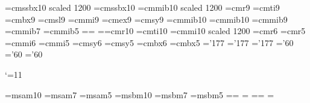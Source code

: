 \newdimen\chapskip
\font\twbf=cmssbx10 scaled 1200 \font\ssbx=cmssbx10
\font\twbi=cmmib10 scaled 1200 \font\caprm=cmr9 \font\capit=cmti9
\font\capbf=cmbx9 \font\capsl=cmsl9 \font\capmi=cmmi9
\font\capex=cmex9 \font\capsy=cmsy9 \chapskip=17.5mm
\def\makeheadline{\vbox to 0pt{\vskip-22.5pt
\line{\vbox to8.5pt{}\the\headline}\vss}\nointerlineskip}
\font\tbfi=cmmib10  %
\font\tenbi=cmmib10 \font\ninebi=cmmib9 \font\sevenbi=cmmib7
\font\fivebi=cmmib5 =\tenbi {}=\sevenbi
{}=\fivebi \font\headrm=cmr10 \font\headit=cmti10
\font\twmi=cmmi10 scaled 1200
\font\sixrm=cmr6 \font\fiverm=cmr5 \font\sixmi=cmmi6
\font\fivemi=cmmi5 \font\sixsy=cmsy6 \font\fivesy=cmsy5
\font\sixbf=cmbx6 \font\fivebf=cmbx5 \skewchar\capmi='177
\skewchar\sixmi='177 \skewchar\fivemi='177 \skewchar\capsy='60
\skewchar\sixsy='60 \skewchar\fivesy='60

\def\elevenpoint{
\textfont0=\caprm \scriptfont0=\sixrm \scriptscriptfont0=\fiverm
\def\rm{\fam0\caprm}
\textfont1=\capmi \scriptfont1=\sixmi \scriptscriptfont1=\fivemi
\textfont2=\capsy \scriptfont2=\sixsy \scriptscriptfont2=\fivesy
\textfont3=\capex \scriptfont3=\capex \scriptscriptfont3=\capex
\textfont\itfam=\capit \def\it{\fam\itfam\capit} %
\textfont\slfam=\capsl  \def\sl{\fam\slfam\capsl} %
\textfont\bffam=\capbf \scriptfont\bffam=\sixbf
\scriptscriptfont\bffam=\fivebf
\def\bf{\fam\bffam\capbf} %
\textfont4=\ninebi \scriptfont4=\sevenbi
\scriptscriptfont4=\fivebi \abovedisplayskip=11pt plus 3pt minus
8pt \belowdisplayskip=\abovedisplayskip
\smallskipamount=2.7pt plus 1pt minus 1pt
\medskipamount=5.4pt plus 2pt minus 2pt
\bigskipamount=10.8pt plus 3.6pt minus 3.6pt
\normalbaselineskip=11pt \setbox\strutbox=\hbox{\vrule height7.8pt
depth3.2pt width0pt} \normalbaselines \rm}


\catcode`\@=11

\font\tenmsa=msam10 \font\sevenmsa=msam7 \font\fivemsa=msam5
\font\tenmsb=msbm10 \font\sevenmsb=msbm7 \font\fivemsb=msbm5
\newfam\msafam
\newfam\msbfam
\textfont\msafam=\tenmsa  \scriptfont\msafam=\sevenmsa
  \scriptscriptfont\msafam=\fivemsa
\textfont\msbfam=\tenmsb  \scriptfont\msbfam=\sevenmsb
  \scriptscriptfont\msbfam=\fivemsb

